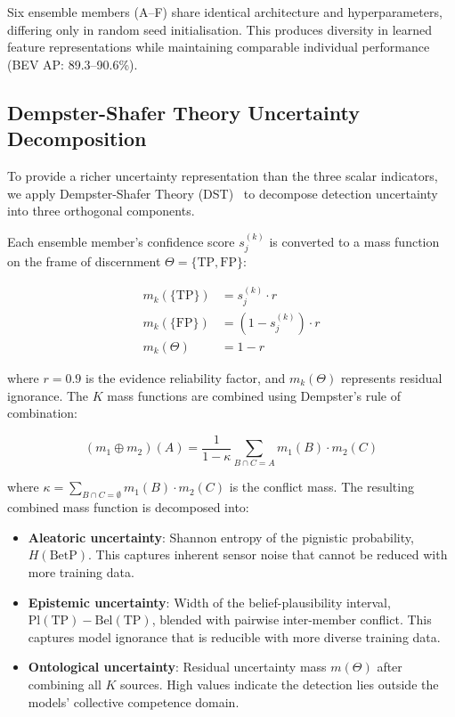 \documentclass[conference]{IEEEtran}
\begin{document}
Six ensemble members (A--F) share identical architecture and hyperparameters, differing only in random seed initialisation. This produces diversity in learned feature representations while maintaining comparable individual performance (BEV AP: 89.3--90.6\%).

\subsection{Dempster-Shafer Theory Uncertainty Decomposition}

To provide a richer uncertainty representation than the three scalar indicators, we apply Dempster-Shafer Theory (DST)~\cite{shafer1976,patel2025dst} to decompose detection uncertainty into three orthogonal components.

Each ensemble member's confidence score $s^{(k)}_j$ is converted to a mass function on the frame of discernment $\Theta = \{\text{TP}, \text{FP}\}$:

\begin{equation}
\begin{aligned}
m_k(\{\text{TP}\}) &= s^{(k)}_j \cdot r \\
m_k(\{\text{FP}\}) &= (1 - s^{(k)}_j) \cdot r \\
m_k(\Theta) &= 1 - r
\end{aligned}
\label{eq:mass_function}
\end{equation}

where $r = 0.9$ is the evidence reliability factor, and $m_k(\Theta)$ represents residual ignorance. The $K$ mass functions are combined using Dempster's rule of combination:

\begin{equation}
(m_1 \oplus m_2)(A) = \frac{1}{1 - \kappa} \sum_{B \cap C = A} m_1(B) \cdot m_2(C)
\label{eq:dempster_rule}
\end{equation}

where $\kappa = \sum_{B \cap C = \emptyset} m_1(B) \cdot m_2(C)$ is the conflict mass. The resulting combined mass function is decomposed into:

\begin{itemize}
    \item \textbf{Aleatoric uncertainty}: Shannon entropy of the pignistic probability, $H(\text{BetP})$. This captures inherent sensor noise that cannot be reduced with more training data.
    \item \textbf{Epistemic uncertainty}: Width of the belief-plausibility interval, $\text{Pl}(\text{TP}) - \text{Bel}(\text{TP})$, blended with pairwise inter-member conflict. This captures model ignorance that is reducible with more diverse training data.
    \item \textbf{Ontological uncertainty}: Residual uncertainty mass $m(\Theta)$ after combining all $K$ sources. High values indicate the detection lies outside the models' collective competence domain.
\end{itemize}
\end{document}
